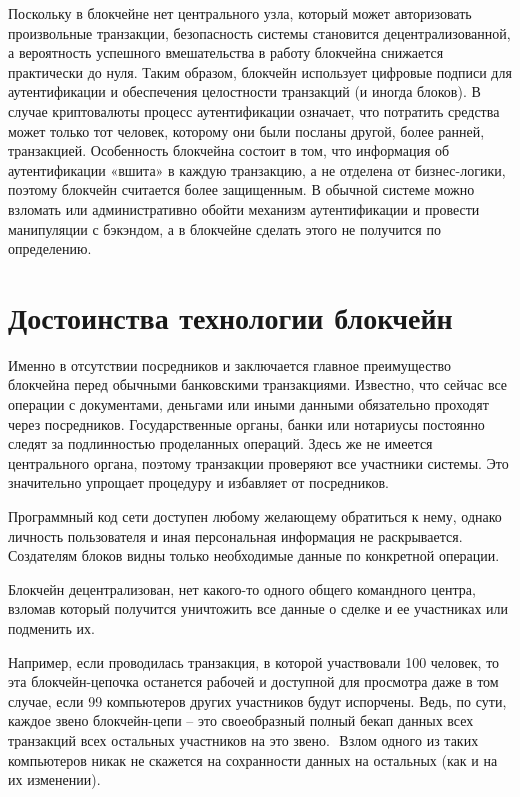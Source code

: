 \documentclass[och, master, pract]{SCWorks_fix}
\theoremstyle{plain}
\theoremstyle{plain}
\theoremstyle{plain}
\theoremstyle{definition}
\begin{document}
Поскольку в блокчейне нет центрального узла, который может авторизовать произвольные транзакции, безопасность системы становится децентрализованной, а вероятность успешного вмешательства в работу блокчейна снижается практически до нуля. Таким образом, блокчейн использует цифровые подписи для аутентификации и обеспечения целостности транзакций (и иногда блоков). В случае криптовалюты процесс аутентификации означает, что потратить средства может только тот человек, которому они были посланы другой, более ранней, транзакцией. Особенность блокчейна состоит в том, что информация об аутентификации «вшита» в каждую транзакцию, а не отделена от бизнес-логики, поэтому блокчейн считается более защищенным. В обычной системе можно взломать или административно обойти механизм аутентификации и провести манипуляции с бэкэндом, а в блокчейне сделать этого не получится по определению.

\section{Достоинства технологии блокчейн}

Именно в отсутствии посредников и заключается главное преимущество блокчейна перед обычными банковскими транзакциями\cite{bib:block:5}. Известно, что сейчас все операции с документами, деньгами или иными данными обязательно проходят через посредников. Государственные органы, банки или нотариусы постоянно следят за подлинностью проделанных операций. Здесь же не имеется центрального органа, поэтому транзакции проверяют все участники системы. Это значительно упрощает процедуру и избавляет от посредников.

Программный код сети доступен любому желающему обратиться к нему, однако личность пользователя и иная персональная информация не раскрывается. Создателям блоков видны только необходимые данные по конкретной операции. 

Блокчейн децентрализован, нет какого-то одного общего командного центра, взломав который получится уничтожить все данные о сделке и ее участниках или подменить их.

Например, если проводилась транзакция, в которой участвовали 100 человек, то эта блокчейн-цепочка останется рабочей и доступной для просмотра даже в том случае, если 99 компьютеров других участников будут испорчены. Ведь, по сути, каждое звено блокчейн-цепи – это своеобразный полный бекап данных всех транзакций всех остальных участников на это звено.  	Взлом одного из таких компьютеров никак не скажется на сохранности данных на остальных (как и на их изменении).
\end{document}
